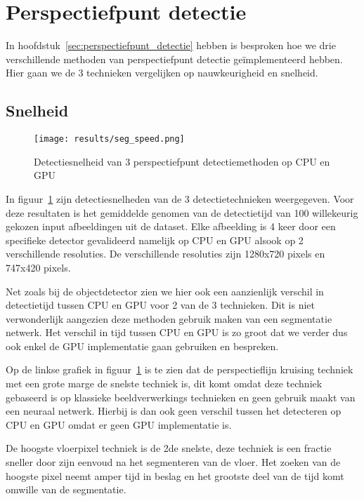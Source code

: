 \section{Perspectiefpunt detectie}

In hoofdstuk~\ref{sec:perspectiefpunt_detectie} hebben is besproken hoe we drie verschillende methoden van perspectiefpunt detectie ge\"{i}mplementeerd hebben.
Hier gaan we de 3 technieken vergelijken op nauwkeurigheid en snelheid.


\subsection{Snelheid}\label{sec:seg_speed}
\begin{figure}[h]
    \texttt{[image: results/seg\_speed.png]}
    \caption{Detectiesnelheid van 3 perspectiefpunt detectiemethoden op \gls{CPU} en \gls{GPU}}
    \label{fig:seg_speed}
\end{figure}

In figuur~\ref{fig:seg_speed} zijn detectiesnelheden van de 3 detectietechnieken weergegeven.
Voor deze resultaten is het gemiddelde genomen van de detectietijd van 100 willekeurig gekozen input afbeeldingen uit de dataset.
Elke afbeelding is 4 keer door een specifieke detector gevalideerd namelijk op \gls{CPU} en \gls{GPU} alsook op 2 verschillende resoluties.
De verschillende resoluties zijn 1280x720 pixels en 747x420 pixels.

Net zoals bij de objectdetector zien we hier ook een aanzienlijk verschil in detectietijd tussen \gls{CPU} en \gls{GPU} voor 2 van de 3 technieken.
Dit is niet verwonderlijk aangezien deze methoden gebruik maken van een segmentatie netwerk.
Het verschil in tijd tussen \gls{CPU} en \gls{GPU} is zo groot dat we verder dus ook enkel de \gls{GPU} implementatie gaan gebruiken en bespreken.

Op de linkse grafiek in figuur~\ref{fig:seg_speed} is te zien dat de perspectieflijn kruising techniek met een grote marge de snelste techniek is, dit komt
omdat deze techniek gebaseerd is op klassieke beeldverwerkings technieken en geen gebruik maakt van een neuraal netwerk.
Hierbij is dan ook geen verschil tussen het detecteren op \gls{CPU} en \gls{GPU} omdat er geen \gls{GPU} implementatie is.

De hoogste vloerpixel techniek is de 2de snelste, deze techniek is een fractie sneller door zijn eenvoud na het segmenteren van de vloer.
Het zoeken van de hoogste pixel neemt amper tijd in beslag en het grootste deel van de tijd komt omwille van de segmentatie.

